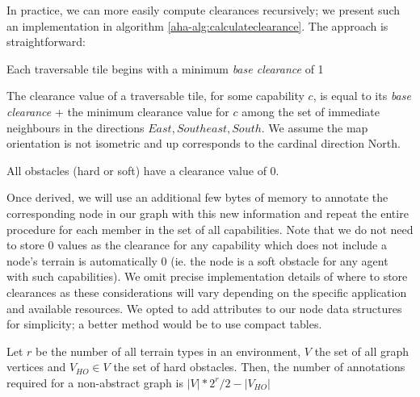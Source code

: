 
In practice, we can more easily compute clearances recursively; we present such an implementation in algorithm \ref{aha-alg:calculateclearance}. The approach is straightforward:  
\begin{definition}
Each traversable tile begins with a minimum \emph{base clearance} of 1
\end{definition}

\begin{definition}
The clearance value of a traversable tile, for some capability $c$, is equal to its \emph{base clearance} + the minimum clearance value for $c$ among the set of immediate neighbours in the directions ${East, Southeast, South}$. We assume the map orientation is not isometric and up corresponds to the cardinal direction North. 
\end{definition}

\begin{definition}
All obstacles (hard or soft) have a clearance value of 0. 
\end{definition}

Once derived, we will use an additional few bytes of memory to annotate the corresponding node in our graph with this new information and repeat the entire procedure for each member in the set of all capabilities. Note that we do not need to store 0 values as the clearance for any capability which does not include a node's terrain is automatically 0 (ie. the node is a soft obstacle for any agent with  such capabilities). We omit precise implementation details of where to store clearances as these considerations will vary depending on the specific application and available resources. We opted to add attributes to our node data structures for simplicity; a better method would be to use compact tables.




\begin{lemma}
\label{aha-lemma:numannotations}
Let $r$ be the number of all terrain types in an environment, $V$ the set of all graph vertices and $V_{HO} \in V$ the set of hard obstacles. Then, the number of annotations required for a non-abstract graph is $|V|*2^r/2 - |V_{HO}|$
\end{lemma}

